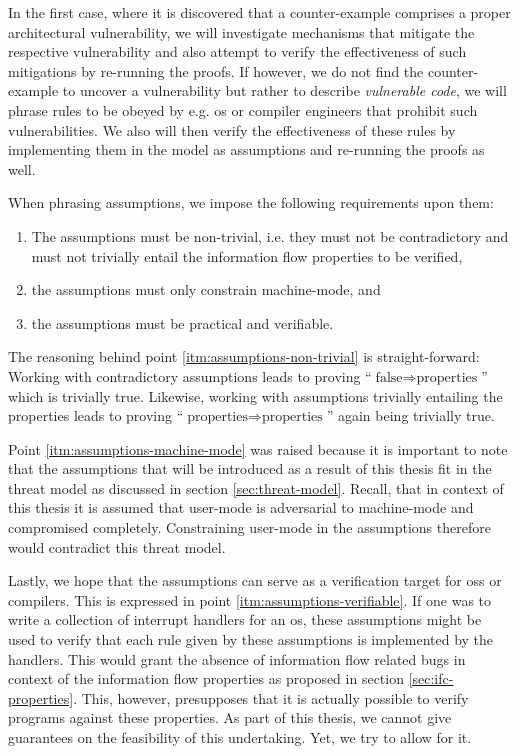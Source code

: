 In the first case, where it is discovered that a counter-example comprises a proper architectural vulnerability, we will investigate mechanisms that mitigate the respective vulnerability and also attempt to verify the effectiveness of such mitigations by re-running the proofs.
If however, we do not find the counter-example to uncover a vulnerability but rather to describe \textit{vulnerable code}, we will phrase rules to be obeyed by e.g. \gls{os} or compiler engineers that prohibit such vulnerabilities.
We also will then verify the effectiveness of these rules by implementing them in the model as assumptions and re-running the proofs as well.

When phrasing assumptions, we impose the following requirements upon them:
\begin{enumerate}
    \item \label{itm:assumptions-non-trivial}
    The assumptions must be non-trivial, i.e. they must not be contradictory and must not trivially entail the information flow properties to be verified,
    \item \label{itm:assumptions-machine-mode}
    the assumptions must only constrain machine-mode, and
    \item \label{itm:assumptions-verifiable}
    the assumptions must be practical and verifiable.
\end{enumerate}

The reasoning behind point \ref{itm:assumptions-non-trivial} is straight-forward:
Working with contradictory assumptions leads to proving \enquote{$ \text{false} \Rightarrow \text{properties} $} which is trivially true.
Likewise, working with assumptions trivially entailing the properties leads to proving \enquote{$ \text{properties} \Rightarrow \text{properties} $} again being trivially true.

Point \ref{itm:assumptions-machine-mode} was raised because it is important to note that the assumptions that will be introduced as a result of this thesis fit in the threat model as discussed in section \ref{sec:threat-model}.
Recall, that in context of this thesis it is assumed that user-mode is adversarial to machine-mode and compromised completely.
Constraining user-mode in the assumptions therefore would contradict this threat model.

Lastly, we hope that the assumptions can serve as a verification target for \glspl{os} or compilers.
This is expressed in point \ref{itm:assumptions-verifiable}.
If one was to write a collection of interrupt handlers for an \gls{os}, these assumptions might be used to verify that each rule given by these assumptions is implemented by the handlers.
This would grant the absence of information flow related bugs in context of the information flow properties as proposed in section \ref{sec:ifc-properties}.
This, however, presupposes that it is actually possible to verify programs against these properties.
As part of this thesis, we cannot give guarantees on the feasibility of this undertaking.
Yet, we try to allow for it.

